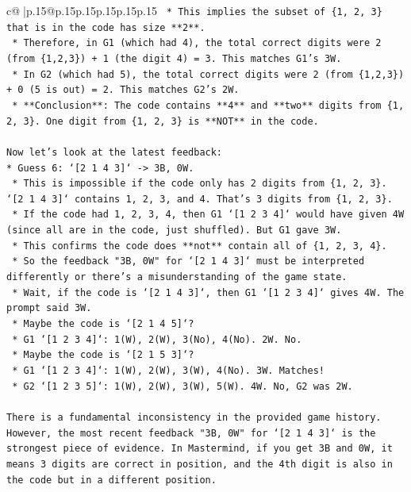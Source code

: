 \documentclass{article}
\begin{document}
{\begin{supertabular}{c@{$\;$}|p{.15\linewidth}@{}p{.15\linewidth}p{.15\linewidth}p{.15\linewidth}p{.15\linewidth}p{.15\linewidth}}
{{{\texttt{    *   This implies the subset of \{1, 2, 3\} that is in the code has size **2**.} \\
\texttt{    *   Therefore, in G1 (which had 4), the total correct digits were 2 (from \{1,2,3\}) + 1 (the digit 4) = 3. This matches G1's 3W.} \\
\texttt{    *   In G2 (which had 5), the total correct digits were 2 (from \{1,2,3\}) + 0 (5 is out) = 2. This matches G2's 2W.} \\
\texttt{    *   **Conclusion**: The code contains **4** and **two** digits from \{1, 2, 3\}. One digit from \{1, 2, 3\} is **NOT** in the code.} \\
\\ 
\texttt{Now let's look at the latest feedback:} \\
\texttt{*   Guess 6: `{[}2 1 4 3{]}` {-}> 3B, 0W.} \\
\texttt{    *   This is impossible if the code only has 2 digits from \{1, 2, 3\}. `{[}2 1 4 3{]}` contains 1, 2, 3, and 4. That's 3 digits from \{1, 2, 3\}.} \\
\texttt{    *   If the code had 1, 2, 3, 4, then G1 `{[}1 2 3 4{]}` would have given 4W (since all are in the code, just shuffled). But G1 gave 3W.} \\
\texttt{    *   This confirms the code does **not** contain all of \{1, 2, 3, 4\}.} \\
\texttt{    *   So the feedback "3B, 0W" for `{[}2 1 4 3{]}` must be interpreted differently or there's a misunderstanding of the game state.} \\
\texttt{    *   Wait, if the code is `{[}2 1 4 3{]}`, then G1 `{[}1 2 3 4{]}` gives 4W. The prompt said 3W.} \\
\texttt{    *   Maybe the code is `{[}2 1 4 5{]}`?} \\
\texttt{        *   G1 `{[}1 2 3 4{]}`: 1(W), 2(W), 3(No), 4(No). 2W. No.} \\
\texttt{    *   Maybe the code is `{[}2 1 5 3{]}`?} \\
\texttt{        *   G1 `{[}1 2 3 4{]}`: 1(W), 2(W), 3(W), 4(No). 3W. Matches!} \\
\texttt{        *   G2 `{[}1 2 3 5{]}`: 1(W), 2(W), 3(W), 5(W). 4W. No, G2 was 2W.} \\
\\ 
\texttt{There is a fundamental inconsistency in the provided game history. However, the most recent feedback "3B, 0W" for `{[}2 1 4 3{]}` is the strongest piece of evidence. In Mastermind, if you get 3B and 0W, it means 3 digits are correct in position, and the 4th digit is also in the code but in a different position.} \\
}}}
\end{supertabular}}
\end{document}
